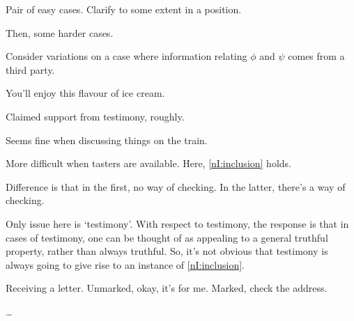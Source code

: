 \begin{note}
  Pair of easy cases.
  Clarify to some extent in a position.

  Then, some harder cases.
\end{note}

\begin{note}[Flavours]
  Consider variations on a case where information relating \(\phi\) and \(\psi\) comes from a third party.

  You'll enjoy this flavour of ice cream.

  Claimed support from testimony, roughly.

  Seems fine when discussing things on the train.

  More difficult when tasters are available.
  Here, \ref{nI:inclusion} holds.
\end{note}

\begin{note}
  Difference is that in the first, no way of checking.
  In the latter, there's a way of checking.

  Only issue here is `testimony'.
  With respect to testimony, the response is that in cases of testimony, one can be thought of as appealing to a general truthful property, rather than always truthful.
  So, it's not obvious that testimony is always going to give rise to an instance of \ref{nI:inclusion}.
\end{note}

\begin{note}
  Receiving a letter.
  Unmarked, okay, it's for me.
  Marked, check the address.
\end{note}

\begin{note}
  \dots
\end{note}

